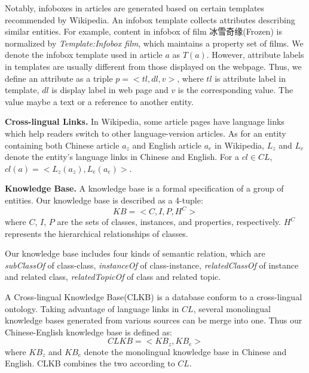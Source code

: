 \documentclass[runningheads,a4paper]{llncs}
\newcommand{\para}[1]{\vspace{0.1cm}\noindent\textbf{#1}}
\begin{document}
Notably, infoboxes in articles are generated based on certain templates recommended by Wikipedia. An infobox template collects attributes describing similar entities. For example, content in infobox of film 冰雪奇缘(Frozen) is normalized by \emph{Template:Infobox film}, which maintains a property set of films. We denote the infobox template used in article $a$ as $T(a)$. However, attribute labels in templates are usually different from those displayed on the webpage. Thus, we define an attribute as a triple $p=<tl,dl,v>$, where $tl$ is attribute label in template, $dl$ is display label in web page and $v$ is the corresponding value. The value maybe a text or a reference to another entity.

\para{Cross-lingual Links.} In Wikipedia, some article pages have language links which help readers switch to other language-version articles. %
As for an entity containing both Chinese article $a_{z}$ and English article $a_{e}$ in Wikipedia, $L_{z}$ and $L_{e}$ denote the entity's language links in Chinese and English. For a $cl \in CL$, $cl(a) = <L_{z}(a_{z}), L_{e}(a_{e})>$.

\para{Knowledge Base.} A knowledge base is a formal specification of a group of entities. Our knowledge base is described as a 4-tuple:
\begin{displaymath}
    KB = <C,I,P,H^C>
\end{displaymath}
where $C$, $I$, $P$ are the sets of classes, instances, and properties, respectively. $H^C$ represents the hierarchical relationships of classes. 

Our knowledge base includes four kinds of semantic relation, which are \textit{subClassOf} of class-class, \textit{instanceOf} of class-instance, \textit{relatedClassOf} of instance and related class, \textit{relatedTopicOf} of class and related topic.

A Cross-lingual Knowledge Base(CLKB) is a database conform to a cross-lingual ontology. Taking advantage of language links in $CL$, several monolingual knowledge bases generated from various sources can be merge into one.  Thus our Chinese-English knowledge base is defined as:
\begin{displaymath}
    CLKB = <KB_{z}, KB_{e}>
\end{displaymath}
where $KB_{z}$ and $KB_{e}$ denote the monolingual knowledge base in Chinese and English. CLKB combines the two according to $CL$.
\end{document}
